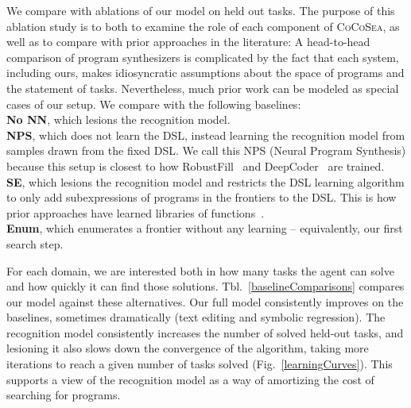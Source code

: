 \documentclass{article}
\newcommand{\systemEnding}{\textsc{CoCoSea}}
\begin{document}
We compare with ablations of our model on held out tasks.
The purpose of this ablation study is to
both to examine the role of each component of \systemEnding,
as well as to compare with
prior approaches in the literature:
A head-to-head
comparison of program synthesizers is complicated by the fact that
each system, including ours, makes idiosyncratic 
assumptions about the space of programs and the statement of tasks.
Nevertheless, much prior work can be modeled as
special cases of our setup. We compare with the following baselines:
\\\noindent \textbf{No NN}, which lesions the recognition model.
\\\noindent \textbf{NPS}, which does not learn the DSL,
instead learning the recognition model
from samples drawn from the fixed DSL.
We call this NPS (Neural Program Synthesis)
because this setup is closest to how
RobustFill~\cite{devlin2017robustfill} and DeepCoder~\cite{balog2016deepcoder} are trained.
\\\noindent \textbf{SE}, which lesions the recognition model and restricts the DSL  learning algorithm to
only add subexpressions of programs in the frontiers to the DSL. This is how prior approaches have learned libraries of functions~\cite{Dechter:2013:BLV:2540128.2540316,DBLP:conf/icml/LiangJK10,DBLP:conf/ecai/LinDETM14}.
\\\noindent \textbf{Enum}, which enumerates a frontier without any learning -- equivalently, our first search step.

For each domain,
we are interested both in how many tasks the
agent can solve and how quickly it can find those solutions.
Tbl.~\ref{baselineComparisons}
compares our model against these alternatives.
Our full model consistently
improves on the baselines,
sometimes dramatically (text editing and symbolic regression).
The recognition model 
consistently increases the number of solved held-out tasks,
and lesioning it also slows down the convergence of the algorithm,
taking more iterations to reach a given number of tasks solved (Fig.~\ref{learningCurves}).
This supports a view of the recognition model as a way of amortizing the cost of searching for programs.
\end{document}
